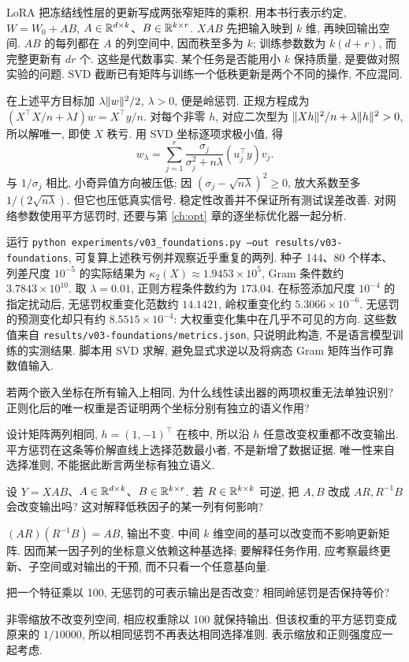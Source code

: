 LoRA 把冻结线性层的更新写成两张窄矩阵的乘积\cite{lora}. 用本书行表示约定, $W=W_0+AB$, $A\in\mathbb R^{d\times k}$、$B\in\mathbb R^{k\times r}$. $XAB$ 先把输入映到 $k$ 维, 再映回输出空间. $AB$ 的每列都在 $A$ 的列空间中, 因而秩至多为 $k$; 训练参数数为 $k(d+r)$, 而完整更新有 $dr$ 个. 这些是代数事实. 某个任务是否能用小 $k$ 保持质量, 是要做对照实验的问题. SVD 截断已有矩阵与训练一个低秩更新是两个不同的操作, 不应混同.

在上述平方目标加 $\lambda\lVert w\rVert^2/2$, $\lambda>0$, 便是岭惩罚. 正规方程成为 $(X^\top X/n+\lambda I)w=X^\top y/n$. 对每个非零 $h$, 对应二次型为 $\lVert Xh\rVert^2/n+\lambda\lVert h\rVert^2>0$, 所以解唯一, 即使 $X$ 秩亏. 用 SVD 坐标逐项求极小值, 得
\[
w_\lambda=\sum_{j=1}^r\frac{\sigma_j}{\sigma_j^2+n\lambda}(u_j^\top y)v_j.
\]
与 $1/\sigma_j$ 相比, 小奇异值方向被压低; 因 $(\sigma_j-\sqrt{n\lambda})^2\ge0$, 放大系数至多 $1/(2\sqrt{n\lambda})$. 但它也压低真实信号. 稳定性改善并不保证所有测试误差改善. 对网络参数使用平方惩罚时, 还要与第 \ref{ch:opt} 章的逐坐标优化器一起分析.

运行 \texttt{python experiments/v03\_foundations.py --out results/v03-foundations}, 可复算上述秩亏例并观察近乎重复的两列. 种子 144、80 个样本、列差尺度 $10^{-5}$ 的实际结果为 $\kappa_2(X)\approx1.9453\times10^5$, Gram 条件数约 $3.7843\times10^{10}$. 取 $\lambda=0.01$, 正则方程条件数约为 $173.04$. 在标签添加尺度 $10^{-4}$ 的指定扰动后, 无惩罚权重变化范数约 $14.1421$, 岭权重变化约 $5.3066\times10^{-6}$. 无惩罚的预测变化却只有约 $8.5515\times10^{-4}$: 大权重变化集中在几乎不可见的方向. 这些数值来自 \texttt{results/v03-foundations/metrics.json}, 只说明此构造, 不是语言模型训练的实测结果. 脚本用 SVD 求解, 避免显式求逆以及将病态 Gram 矩阵当作可靠数值输入.

\begin{exercise}
若两个嵌入坐标在所有输入上相同, 为什么线性读出器的两项权重无法单独识别? 正则化后的唯一权重是否证明两个坐标分别有独立的语义作用?
\end{exercise}
\begin{solution}
设计矩阵两列相同, $h=(1,-1)^\top$ 在核中, 所以沿 $h$ 任意改变权重都不改变输出. 平方惩罚在这条等价解直线上选择范数最小者, 不是新增了数据证据. 唯一性来自选择准则, 不能据此断言两坐标有独立语义.
\end{solution}
\begin{exercise}
设 $Y=XAB$、$A\in\mathbb R^{d\times k}$、$B\in\mathbb R^{k\times r}$. 若 $R\in\mathbb R^{k\times k}$ 可逆, 把 $A,B$ 改成 $AR,R^{-1}B$ 会改变输出吗? 这对解释低秩因子的某一列有何影响?
\end{exercise}
\begin{solution}
$(AR)(R^{-1}B)=AB$, 输出不变. 中间 $k$ 维空间的基可以改变而不影响更新矩阵. 因而某一因子列的坐标意义依赖这种基选择; 要解释任务作用, 应考察最终更新、子空间或对输出的干预, 而不只看一个任意基向量.
\end{solution}
\begin{exercise}
把一个特征乘以 100, 无惩罚的可表示输出是否改变? 相同岭惩罚是否保持等价?
\end{exercise}
\begin{solution}
非零缩放不改变列空间, 相应权重除以 100 就保持输出. 但该权重的平方惩罚变成原来的 $1/10000$, 所以相同惩罚不再表达相同选择准则. 表示缩放和正则强度应一起考虑.
\end{solution}
\label{ch:end:02}
